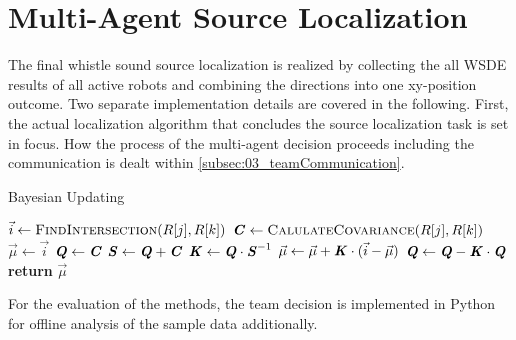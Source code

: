 \section{Multi-Agent Source Localization}
\label{sec:03_multiAgentLoca}

The final whistle sound source localization is realized by collecting the
all \ac{WSDE} results of all active robots and combining the directions
into one xy-position outcome.
Two separate implementation details are covered in the following.
First, the actual localization algorithm that concludes the source localization
task is set in focus.
How the process of the multi-agent decision proceeds including the communication
is dealt within \cref{subsec:03_teamCommunication}.


\begin{algorithm}[H]
    \caption{Bayesian Updating}\label{alg:03_multiAgentLoca}
    \begin{algorithmic}[1]
                    \State $\vec{i} \gets \Call{FindIntersection}{R[j], R[k]}$
                    \State $\textbf{\textit{C}} \gets \Call{CalulateCovariance}{R[j], R[k]}$
                        \State $\vec{\mu} \gets \vec{i}$
                        \State $\textbf{\textit{Q}} \gets \textbf{\textit{C}}$
                        \State $\textbf{\textit{S}} \gets \textbf{\textit{Q}} + \textbf{\textit{C}}$
                        \State $\textbf{\textit{K}} \gets \textbf{\textit{Q}} \cdot \textbf{\textit{S}}^{-1}$
                        \State $\vec{\mu} \gets \vec{\mu} + \textbf{\textit{K}} \cdot (\vec{i} - \vec{\mu})$
                        \State $\textbf{\textit{Q}} \gets \textbf{\textit{Q}} - \textbf{\textit{K}} \cdot \textbf{\textit{Q}}$
                    \EndIf
                \EndFor
            \EndFor
            \State \textbf{return} $\vec{\mu}$
        \EndProcedure\vspace{12pt}
    \end{algorithmic}
\end{algorithm}


For the evaluation of the methods, the team decision is implemented in
Python for offline analysis of the sample data additionally.

